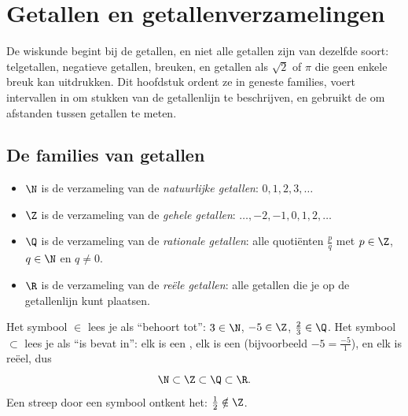 \chapter{Getallen en getallenverzamelingen}\label{ch:g10:numbers}

De wiskunde begint bij de getallen, en niet alle getallen zijn van dezelfde
soort: telgetallen, negatieve getallen, breuken, en getallen als $\sqrt 2$ of
$\pi$ die geen enkele breuk kan uitdrukken. Dit hoofdstuk ordent ze in
geneste families, voert intervallen in om stukken van de getallenlijn te
beschrijven, en gebruikt de  om afstanden tussen getallen te
meten.

\section{De families van getallen}

\begin{definition}[Getallenverzamelingen]\label{def:g10:numbers:sets}
\begin{itemize}
  \item $\N$ is de verzameling van de \emph{natuurlijke getallen}: $0, 1, 2, 3, \dots$
  \item $\Z$ is de verzameling van de \emph{gehele getallen}:
        $\dots, -2, -1, 0, 1, 2, \dots$
  \item $\Q$ is de verzameling van de \emph{rationale getallen}: alle quotiënten $\frac{p}{q}$ met $p \in \Z$, $q \in \N$ en
        $q \neq 0$.
  \item $\R$ is de verzameling van de \emph{reële getallen}:
        alle getallen die je op de getallenlijn kunt plaatsen.
\end{itemize}
\end{definition}

\begin{notation}
Het symbool $\in$ lees je als ``behoort tot'': $3 \in \N$, $-5 \in \Z$,
$\frac23 \in \Q$. Het symbool $\subset$ lees je als ``is bevat in'': elk
 is een , elk  is een 
(bijvoorbeeld $-5 = \frac{-5}{1}$), en elk  is reëel, dus
\[
\N \subset \Z \subset \Q \subset \R .
\]
Een streep door een symbool ontkent het: $\frac12 \notin \Z$.
\end{notation}

